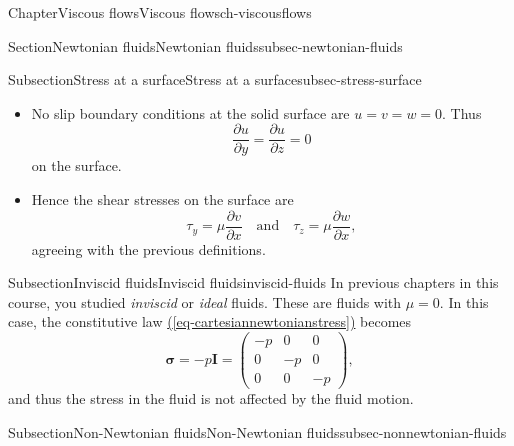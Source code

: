 \documentclass[oneside,10pt,]{book}
\newcommand{\xreffont}{\relax}
\newcommand{\ptxlistdisc}{\raisebox{0.3ex}{\textbullet}}
\numberwithin{equation}{section}
\newcommand{\pd}[2]{\frac{\partial#1}{\partial#2}}
\newcommand{\bn}{\boldsymbol{n}}
\newcommand{\bsigma}{\boldsymbol{\sigma}}
\newcommand{\btau}{\boldsymbol{\tau}}
\newcommand{\bI}{\boldsymbol{I}}
\begin{document}
\begin{chapterptx}{Chapter}{Viscous flows}{}{Viscous flows}{}{}{ch-viscousflows}
\begin{sectionptx}{Section}{Newtonian fluids}{}{Newtonian fluids}{}{}{subsec-newtonian-fluids}
\begin{subsectionptx}{Subsection}{Stress at a surface}{}{Stress at a surface}{}{}{subsec-stress-surface}
\begin{itemize}[label=\ptxlistdisc]
\begin{equation*}
\btau=\bsigma\bn
=\left(\begin{matrix}
-p+2\mu\pd{u}{x}\\
\mu\left(\pd{u}{y}+\pd{v}{x}\right)\\
\mu\left(\pd{u}{z}+\pd{w}{x}\right)
\end{matrix}\right),
\end{equation*}
and the shear stresses are given by the \(y\)- and \(z\)-components:%
\begin{equation*}
\tau_y=\mu\left(\pd{u}{y}+\pd{v}{x}\right),\quad
\tau_z=\mu\left(\pd{u}{z}+\pd{w}{x}\right).
\end{equation*}
%
\item{}No slip boundary conditions at the solid surface are \(u=v=w=0\). Thus%
\begin{equation*}
\pd{u}{y}=\pd{u}{z}=0
\end{equation*}
on the surface.%
\item{}Hence the shear stresses on the surface are%
\begin{equation*}
\tau_y=\mu\pd{v}{x}\quad\textrm{and}\quad\tau_z=\mu\pd{w}{x},
\end{equation*}
agreeing with the previous definitions.%
\end{itemize}
%
\end{subsectionptx}
%
%
\typeout{************************************************}
\typeout{************************************************}
%
\begin{subsectionptx}{Subsection}{Inviscid fluids}{}{Inviscid fluids}{}{}{inviscid-fluids}
In previous chapters in this course, you studied \emph{inviscid} or \emph{ideal} fluids. These are fluids with \(\mu=0\). In this case, the constitutive law \hyperref[eq-cartesiannewtonianstress]{({\xreffont\ref{eq-cartesiannewtonianstress}})} becomes%
\begin{equation}
\bsigma=-p \bI=\left(\begin{matrix}
-p&0&0\\
0&-p&0\\
0&0&-p
\end{matrix}\right),\label{eq-inviscidstress}
\end{equation}
and thus the stress in the fluid is not affected by the fluid motion.%
\end{subsectionptx}
%
%
\typeout{************************************************}
\typeout{************************************************}
%
\begin{subsectionptx}{Subsection}{Non-Newtonian fluids}{}{Non-Newtonian fluids}{}{}{subsec-nonnewtonian-fluids}

\end{subsectionptx}
\end{sectionptx}
\end{chapterptx}
\end{document}
